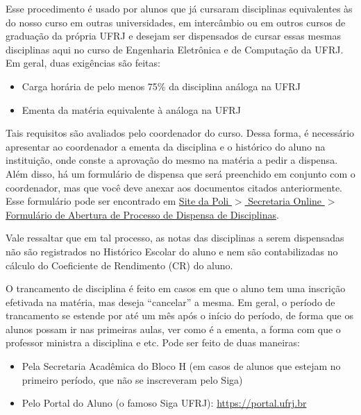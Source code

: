 
        Esse procedimento é usado por alunos que já cursaram disciplinas equivalentes às do nosso curso em outras universidades, em intercâmbio ou em outros cursos de graduação da própria UFRJ e desejam ser dispensados de cursar essas mesmas disciplinas aqui no curso de Engenharia Eletrônica e de Computação da UFRJ. Em geral, duas exigências são feitas: 
            \begin{itemize}
                \item Carga horária de pelo menos 75\% da disciplina análoga na UFRJ
                \item Ementa da matéria equivalente à análoga na UFRJ
            \end{itemize}
            
        Tais requisitos são avaliados pelo coordenador do curso. Dessa forma, é necessário apresentar ao coordenador a ementa da disciplina e o histórico do aluno na instituição, onde conste a aprovação do mesmo na matéria a pedir a dispensa. Além disso, há um formulário de dispensa que será preenchido em conjunto com o coordenador, mas que você deve anexar aos documentos citados anteriormente. Esse formulário pode ser encontrado em \href{http://www.poli.ufrj.br/arquivos/secretaria/Novo\_formulario\_de\_Dispensa\_de\_Disciplinas\_Protocolo\_da\_POLI.pdf}{Site da Poli $>$ Secretaria Online $>$ Formulário de Abertura de Processo de Dispensa de Disciplinas}.
        
        Vale ressaltar que em tal processo, as notas das disciplinas a serem dispensadas não são registrados no Histórico Escolar do aluno e nem são contabilizadas no cálculo do Coeficiente de Rendimento (CR) do aluno.
    
        O trancamento de disciplina é feito em casos em que o aluno tem uma inscrição efetivada na matéria, mas deseja ``cancelar'' a mesma. Em geral, o período de trancamento se estende por até um mês após o início do período, de forma que os alunos possam ir nas primeiras aulas, ver como é a ementa, a forma com que o professor ministra a disciplina e etc. Pode ser feito de duas maneiras:
            
            \begin{itemize}
                \item Pela Secretaria Acadêmica do Bloco H (em casos de alunos que estejam no primeiro período, que não se inscreveram pelo Siga)
                \item Pelo Portal do Aluno (o famoso Siga UFRJ): \href{https://portal.ufrj.br}{https://portal.ufrj.br}
            \end{itemize}
    
